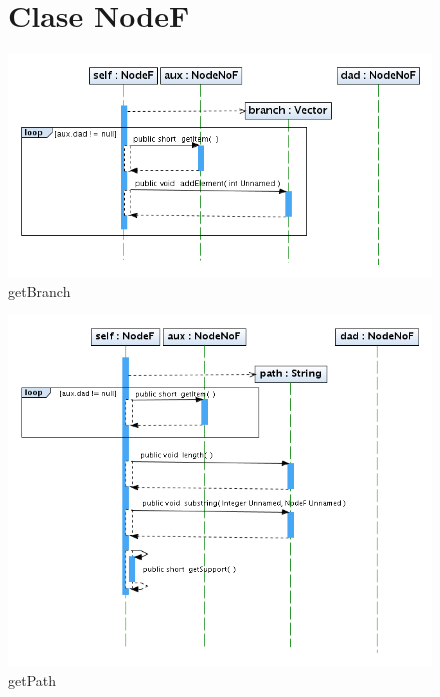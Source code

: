 
\begin{figure}
\section{Clase NodeF}
\centering
\includegraphics[width=1\textwidth]{NodeF/getBranch.png}
\caption{getBranch}
\end{figure}
\newpage

\begin{figure}
\centering
\includegraphics[width=1\textwidth]{NodeF/getPath.png}
\caption{getPath}
\end{figure}
\newpage


